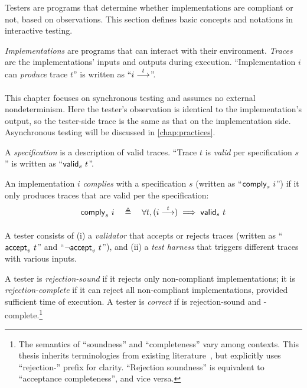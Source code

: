 Testers are programs that determine whether implementations are compliant or
not, based on observations.  This section defines basic concepts and notations
in interactive testing.

\begin{definition}
  {\em Implementations} are programs that can interact with their environment.
  {\em Traces} are the implementations' inputs and outputs during execution.
  ``Implementation $i$ can {\em produce} trace $t$'' is written as ``$\behaves i
  t$''.
\end{definition}

This chapter focuses on synchronous testing and assumes no external
nondeterminism.  Here the tester's observation is identical to the
implementation's output, so the tester-side trace is the same as that on the
implementation side.  Asynchronous testing will be discussed in
\autoref{chap:practices}.

\begin{definition}
  \label{def:compliance}
  A {\em specification} is a description of valid traces.  ``Trace $t$ is {\em
    valid} per specification $s$'' is written as ``$\mathsf{valid}_{s}~{t}$''.

  An implementation $i$ {\em complies} with a specification $s$ (written as
  ``$\mathsf{comply}_{s}~{i}$'') if it only produces traces that are valid per the
  specification:
  \[\complies s i\quad\triangleq\quad\forall t,(\behaves i t)\implies\valid s t\]
\end{definition}

\begin{definition}
  \label{def:tester}
  A tester consists of (i) a {\em validator} that accepts or rejects
  traces (written as ``$\mathsf{accept}_{v}~{t}$'' and ``$\neg\mathsf{accept}_{v}~{t}$''), and
  (ii) a {\em test harness} that triggers different traces with
  various inputs.

  A tester is {\em rejection-sound} if it rejects only non-compliant
  implementations; it is {\em rejection-complete} if it can reject all
  non-compliant implementations, provided sufficient time of execution.  A
  tester is {\em correct} if is rejection-sound and -complete.\footnote{The
    semantics of ``soundness'' and ``completeness'' vary among contexts.  This
    thesis inherits terminologies from existing literature~\cite{Tretmans}, but
    explicitly uses ``rejection-'' prefix for clarity.  ``Rejection soundness''
    is equivalent to ``acceptance completeness'', and vice versa.}
\end{definition}

